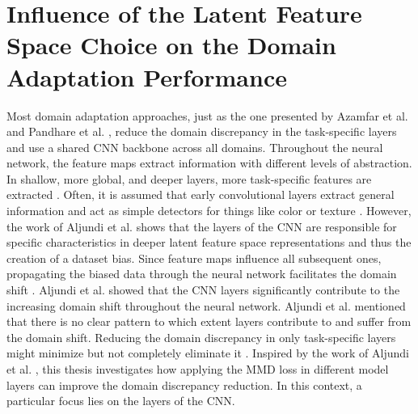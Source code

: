 \section{Influence of the Latent Feature Space Choice on the Domain Adaptation Performance}
Most domain adaptation approaches, just as the one presented by Azamfar et al. \cite{AZAMFAR2020103932} and Pandhare et al. \cite{Pandhare2021}, reduce the domain discrepancy in the task-specific layers and use a shared CNN backbone across all domains. Throughout the neural network, the feature maps extract information with different levels of abstraction. In shallow, more global, and deeper layers, more task-specific features are extracted \cite{Aljundi2016}. Often, it is assumed that early convolutional layers extract general information and act as simple detectors for things like color or texture \cite{Aljundi2016}. However, the work of Aljundi et al. \cite{Aljundi2016} shows that the layers of the CNN are responsible for specific characteristics in deeper latent feature space representations and thus the creation of a dataset bias. Since feature maps influence all subsequent ones, propagating the biased data through the neural network facilitates the domain shift \cite{Aljundi2016}. Aljundi et al. \cite{Aljundi2016} showed that the CNN layers significantly contribute to the increasing domain shift throughout the neural network. Aljundi et al. \cite{Aljundi2016} mentioned that there is no clear pattern to which extent layers contribute to and suffer from the domain shift. Reducing the domain discrepancy in only task-specific layers might minimize but not completely eliminate it \cite{li2020}. Inspired by the work of Aljundi et al. \cite{Aljundi2016}, this thesis investigates how applying the MMD loss in different model layers can improve the domain discrepancy reduction. In this context, a particular focus lies on the layers of the CNN.


